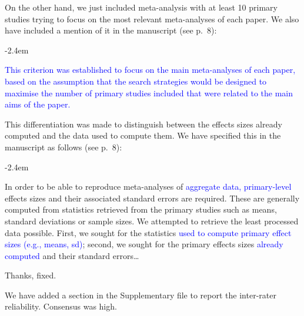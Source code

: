 \documentclass[draft]{article}
\renewenvironment{quote}{\begin{fquote}\advance\leftmargini -2.4em\begin{oldquote}}{\end{oldquote}\end{fquote}}
\newenvironment{fquote}
  {\def\FrameCommand{
	\fboxsep=0.6em %
	\fcolorbox{black}{white}}%
    \MakeFramed {\advance\hsize-2\width \FrameRestore}
    \begin{minipage}{\linewidth}
  }
  {\end{minipage}\endMakeFramed}
\begin{document}
On the other hand, we just included meta-analysis with at least 10 primary studies trying to focus on the most relevant meta-analyses of each paper. We also have included a mention of it in the manuscript (see p.~8):

\begin{quote}
\textcolor{blue}{This criterion was established to focus on the main meta-analyses of each paper, based on the assumption that the search strategies would be designed to maximise the number of primary studies included that were related to the main aims of the paper.}
\end{quote}


This differentiation was made to distinguish between the effects sizes already computed and the data used to compute them. We have specified this in the manuscript as follows (see p.~8):

\begin{quote}
In order to be able to reproduce meta-analyses of \textcolor{blue}{aggregate data, primary-level} effects sizes and their associated standard errors are required. These are generally computed from statistics retrieved from the primary studies such as means, standard deviations or sample sizes. We attempted to retrieve the least processed data possible. First, we sought for the statistics \textcolor{blue}{used to compute primary effect sizes (e.g., means, sd)}; second, we sought for the primary effects sizes \textcolor{blue}{already computed} and their standard errors\ldots{}
\end{quote}


Thanks, fixed.


We have added a section in the Supplementary file to report the inter-rater reliability. Consensus was high.

\end{document}
